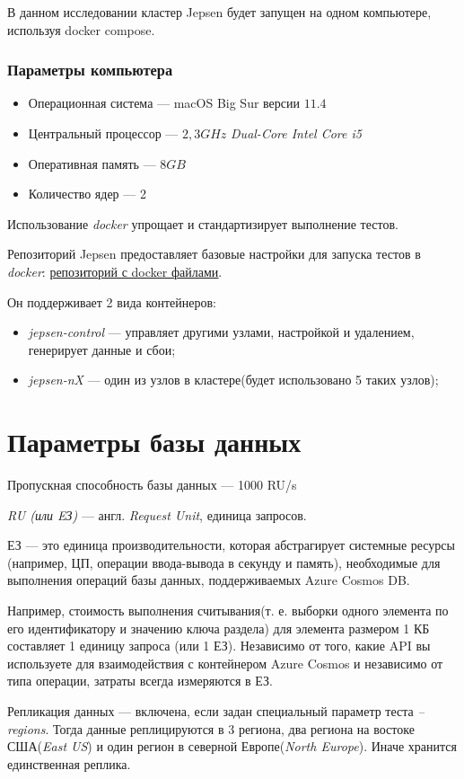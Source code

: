\documentclass[12pt,  openany]{book}
\begin{document}
\par В данном исследовании кластер Jepsen будет запущен на одном компьютере, используя docker compose. 
\subsubsection{Параметры компьютера}
\begin{itemize}
\item Операционная система --- macOS Big Sur версии $11.4$
\item Центральный процессор --- $2,3 GHz$ \textit{Dual-Core Intel Core i5}
\item Оперативная память --- $8 GB$
\item Количество ядер --- 2
\end{itemize}
Использование \textit{docker} упрощает и стандартизирует выполнение тестов. 
\par Репозиторий Jepsen предоставляет базовые настройки для запуска тестов в \textit{docker}: \underline{\href{https://github.com/jepsen-io/jepsen/tree/main/docker}{репозиторий с docker файлами}}.
\par Он поддерживает 2 вида контейнеров:  
\begin{itemize}
\item \textit{jepsen-control} --- управляет другими узлами, настройкой и удалением, генерирует данные и сбои;
\item \textit{jepsen-nX} --- один из узлов в кластере(будет использовано 5 таких узлов);
\end{itemize}

\section{Параметры базы данных}
Пропускная способность базы данных --- 1000 RU/s
\par \textit{RU (или EЗ)} --- англ. \textit{Request Unit},  единица запросов. 
\par ЕЗ — это единица производительности, которая абстрагирует системные ресурсы (например, ЦП, операции ввода-вывода в секунду и память), необходимые для выполнения операций базы данных, поддерживаемых Azure Cosmos DB.
\par Например, стоимость выполнения считывания(т. е. выборки одного элемента по его идентификатору и значению ключа раздела) для элемента размером 1 КБ составляет 1 единицу запроса (или 1 ЕЗ). Независимо от того, какие API вы используете для взаимодействия с контейнером Azure Cosmos и независимо от типа операции, затраты всегда измеряются в ЕЗ. 
\par Репликация данных --- включена, если задан специальный параметр теста \textit{--regions}. Тогда данные реплицируются в 3 региона, два региона на востоке США(\textit{East US}) и один регион в северной Европе(\textit{North Europe}).  Иначе хранится единственная реплика. 
\end{document}
